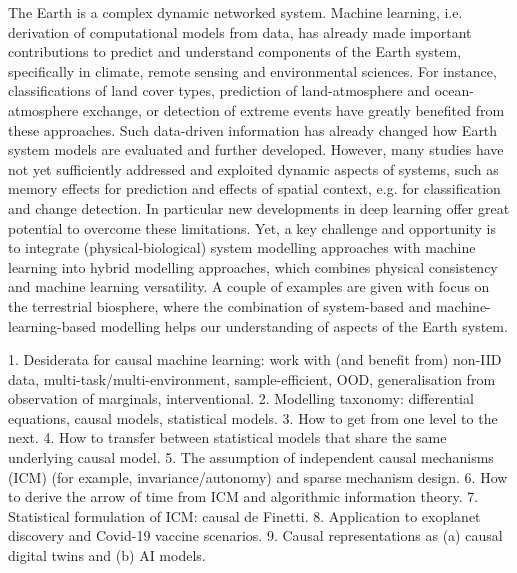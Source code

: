 \documentclass[a4paper,UKenglish]{dagrep-v2021}
\begin{document}
The Earth is a complex dynamic networked system. Machine learning, i.e. derivation of computational models from data, has already made important contributions to predict and understand components of the Earth system, specifically in climate, remote sensing and environmental sciences. For instance, classifications of land cover types, prediction of land-atmosphere and ocean-atmosphere exchange, or detection of extreme events have greatly benefited from these approaches. Such data-driven information has already changed how Earth system models are evaluated and further developed. However, many studies have not yet sufficiently addressed and exploited dynamic aspects of systems, such as memory effects for prediction and effects of spatial context, e.g. for classification and change detection. In particular new developments in deep learning offer great potential to overcome these limitations. Yet, a key challenge and opportunity is to integrate (physical-biological) system modelling approaches with machine learning into hybrid modelling approaches, which combines physical consistency and machine learning versatility. A couple of examples are given with focus on the terrestrial biosphere, where the combination of system-based and machine-learning-based modelling helps our understanding of aspects of the Earth system.

\license

1.	Desiderata for causal machine learning: work with (and benefit from) non-IID data, multi-task/multi-environment, sample-efficient, OOD, generalisation from observation of marginals, interventional.
2.	Modelling taxonomy: differential equations, causal models, statistical models.
3.	How to get from one level to the next.
4.	How to transfer between statistical models that share the same underlying causal model. 
5.	The assumption of independent causal mechanisms (ICM) (for example, invariance/autonomy) and sparse mechanism design. 
6.	How to derive the arrow of time from ICM and algorithmic information theory.
7.	Statistical formulation of ICM: causal de Finetti.
8.	Application to exoplanet discovery and Covid-19 vaccine scenarios.
9.	Causal representations as (a) causal digital twins and (b) AI models.

\license
\end{document}
